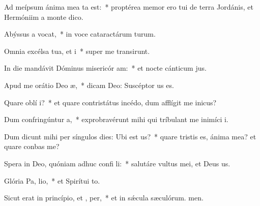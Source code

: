 \item Ad meípsum ánima mea ta est:~* proptérea memor ero tui de terra Jordánis, et Hermóniim a monte dico.
\item Abýssus a vocat,~* in voce cataractárum turum.
\item Omnia excélsa tua, et  i~* super me transirunt.
\item In die mandávit Dóminus misericór am:~* et nocte cánticum jus.
\item Apud me orátio Deo  æ,~* dicam Deo: Suscéptor us es.
\item Quare oblí  i?~* et quare contristátus incédo, dum afflígit me inicus?
\item Dum confringúntur  a,~* exprobravérunt mihi qui tríbulant me inimíci i.
\item Dum dicunt mihi per síngulos dies: Ubi est  us?~* quare tristis es, ánima mea? et quare conbas me?
\item Spera in Deo, quóniam adhuc confi li:~* salutáre vultus mei, et Deus us.
\item Glória Pa,  lio,~* et Spirítui to.
\item Sicut erat in princípio, et ,  per,~* et in sǽcula sæculórum. men.
